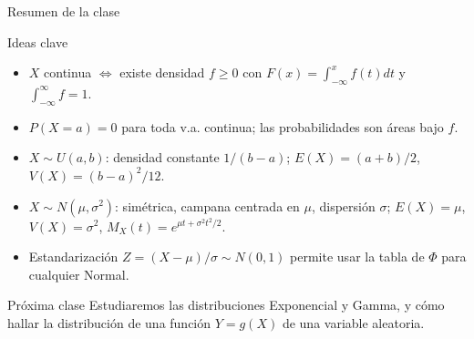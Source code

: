\documentclass[aspectratio=169,11pt]{beamer}
\begin{document}
\begin{frame}{Resumen de la clase}
\begin{block}{Ideas clave}
\begin{itemize}
\item $X$ continua $\Leftrightarrow$ existe densidad $f\ge 0$ con $F(x)=\int_{-\infty}^x f(t)dt$ y $\int_{-\infty}^\infty f=1$.
\item $P(X=a)=0$ para toda v.a. continua; las probabilidades son áreas bajo $f$.
\item $X\sim U(a,b)$: densidad constante $1/(b-a)$; $E(X)=(a+b)/2$, $V(X)=(b-a)^2/12$.
\item $X\sim N(\mu,\sigma^2)$: simétrica, campana centrada en $\mu$, dispersión $\sigma$; $E(X)=\mu$, $V(X)=\sigma^2$, $M_X(t)=e^{\mu t+\sigma^2t^2/2}$.
\item Estandarización $Z=(X-\mu)/\sigma \sim N(0,1)$ permite usar la tabla de $\Phi$ para cualquier Normal.
\end{itemize}
\end{block}

\begin{alertblock}{Próxima clase}
Estudiaremos las distribuciones Exponencial y Gamma, y cómo hallar la distribución de una función $Y=g(X)$ de una variable aleatoria.
\end{alertblock}
\end{frame}
\end{document}

